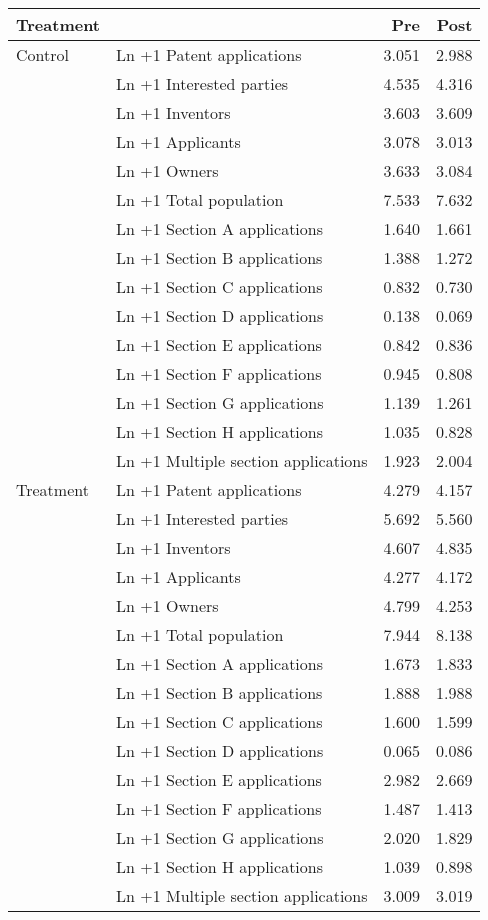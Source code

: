 
\begin{tabular}[t]{llrr}
\toprule
Treatment &   & Pre & Post\\
\midrule
Control & Ln +1 Patent applications & \num{3.051} & \num{2.988}\\
 & Ln +1 Interested parties & \num{4.535} & \num{4.316}\\
 & Ln +1 Inventors & \num{3.603} & \num{3.609}\\
 & Ln +1 Applicants & \num{3.078} & \num{3.013}\\
 & Ln +1 Owners & \num{3.633} & \num{3.084}\\
 & Ln +1 Total population & \num{7.533} & \num{7.632}\\
 & Ln +1 Section A applications & \num{1.640} & \num{1.661}\\
 & Ln +1 Section B applications & \num{1.388} & \num{1.272}\\
 & Ln +1 Section C applications & \num{0.832} & \num{0.730}\\
 & Ln +1 Section D applications & \num{0.138} & \num{0.069}\\
 & Ln +1 Section E applications & \num{0.842} & \num{0.836}\\
 & Ln +1 Section F applications & \num{0.945} & \num{0.808}\\
 & Ln +1 Section G applications & \num{1.139} & \num{1.261}\\
 & Ln +1 Section H applications & \num{1.035} & \num{0.828}\\
 & Ln +1 Multiple section applications & \num{1.923} & \num{2.004}\\
Treatment & Ln +1 Patent applications & \num{4.279} & \num{4.157}\\
 & Ln +1 Interested parties & \num{5.692} & \num{5.560}\\
 & Ln +1 Inventors & \num{4.607} & \num{4.835}\\
 & Ln +1 Applicants & \num{4.277} & \num{4.172}\\
 & Ln +1 Owners & \num{4.799} & \num{4.253}\\
 & Ln +1 Total population & \num{7.944} & \num{8.138}\\
 & Ln +1 Section A applications & \num{1.673} & \num{1.833}\\
 & Ln +1 Section B applications & \num{1.888} & \num{1.988}\\
 & Ln +1 Section C applications & \num{1.600} & \num{1.599}\\
 & Ln +1 Section D applications & \num{0.065} & \num{0.086}\\
 & Ln +1 Section E applications & \num{2.982} & \num{2.669}\\
 & Ln +1 Section F applications & \num{1.487} & \num{1.413}\\
 & Ln +1 Section G applications & \num{2.020} & \num{1.829}\\
 & Ln +1 Section H applications & \num{1.039} & \num{0.898}\\
 & Ln +1 Multiple section applications & \num{3.009} & \num{3.019}\\
\bottomrule
\end{tabular}
